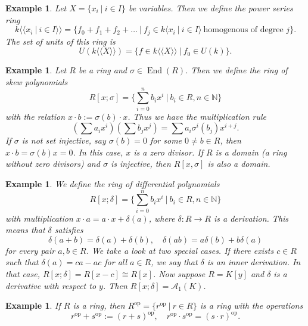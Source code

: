 \documentclass[10pt, a4paper]{article}
\newtheorem{example}[thm]{Example}
\newcommand{\N}{\mathbb {N}}
\DeclareMathOperator{\op}{op}
\DeclareMathOperator{\en}{End}
\begin{document}
\begin{example}
        Let $X = \{x_i\ |\ i \in I\}$ be variables. Then we define the power series ring 
        $$k\langle \langle x_i\ |\ i \in I\rangle \rangle = \{f_0 + f_1 +f_2 + \dots\ |\ f_j \in k\langle x_i\ |\ i \in I\rangle\ \textrm{homogenous of degree $j$}\}.$$
        The set of units of this ring is 
        $$U(k \langle \langle X \rangle \rangle) = \{f \in k \langle \langle X \rangle \rangle\ |\ f_0 \in U(k)\}.$$    
\end{example}

\begin{example}
        Let $R$ be a ring and $\sigma \in \en (R)$. Then we define the ring of skew polynomials 
        $$R[x; \sigma] = \{\sum_{i = 0} ^n b_i x^i\ |\ b_i \in R, n \in \N\}$$
        with the relation $x \cdot b := \sigma (b) \cdot x$. Thus we have the multiplication rule 
        $$\left(\sum a_i x^i\right) \left(\sum b_j x^j\right) = \sum a_i \sigma^i (b_j) x^{i + j}.$$
        If $\sigma$ is not set injective, say $\sigma (b) = 0$ for some $0 \neq b \in R$,
        then $x \cdot b = \sigma(b) x = 0$. In this case, $x$ is a zero divisor.
        If $R$ is a domain (a ring without zero divisors) and $\sigma$ is injective, then $R[x, \sigma]$ is also a domain.    
\end{example}

\begin{example}
        We define the ring of differential polynomials $$R[x; \delta] = \{\sum_{i = 0} ^n b_i x^i\ |\ b_i \in R, n \in \N\}$$
        with multiplication $x \cdot a = a \cdot x + \delta(a)$,
        where $\delta: R \to R$ is a derivation. This means that $\delta$ satisfies 
        $$\delta(a + b) = \delta (a) + \delta(b),\quad \delta(ab) = a\delta (b) + b\delta(a) $$
        for every pair $a, b \in R$. We take a look at two special cases. If there exists $c \in R$ such that $\delta (a) = ca - ac$ for all $a \in R$, we say that $\delta$ is an inner derivation.
        In that case, $R[x; \delta] = R[x - c] \cong R[x]$.
        Now suppose $R = K[y]$ and $\delta$ is a derivative with respect to $y$.
        Then $R[x; \delta] = \mathcal{A}_1 (K)$. 
\end{example}

\begin{example}
    If $R$ is a ring, then $R^{\op} = \{r^{\op}\ |\ r \in R\}$ is a ring with the operations 
    $$r^{\op} + s^{\op} := (r + s)^{\op},\quad r^{\op} \cdot s^{\op} = (s \cdot r)^{\op}.$$
\end{example}
\end{document}
